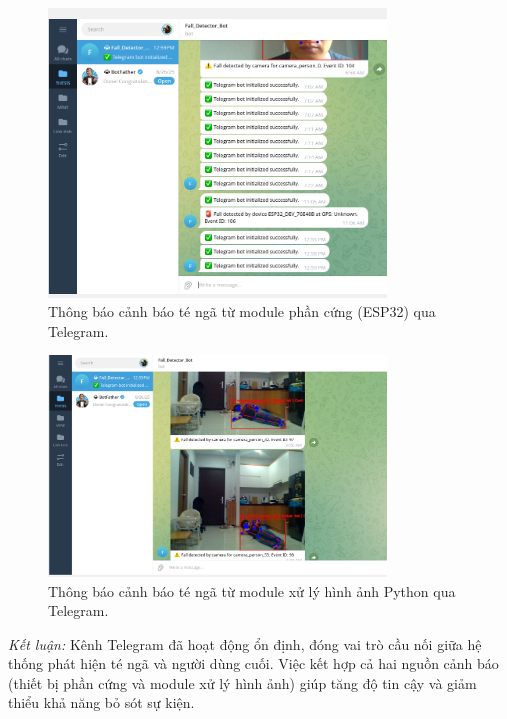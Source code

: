 \begin{figure}[H]
    \centering
    \includegraphics[width=0.8\textwidth]{figures/telegram_fall_module1_send.png}
    \caption{Thông báo cảnh báo té ngã từ module phần cứng (ESP32) qua Telegram.}
    \label{fig:telegram_hw}
\end{figure}

\begin{figure}[H]
    \centering
    \includegraphics[width=0.8\textwidth]{figures/telegram_python_fall_send.png}
    \caption{Thông báo cảnh báo té ngã từ module xử lý hình ảnh Python qua Telegram.}
    \label{fig:telegram_python}
\end{figure}

\textit{Kết luận:} Kênh Telegram đã hoạt động ổn định, đóng vai trò cầu nối giữa hệ thống phát hiện té ngã và người dùng cuối. Việc kết hợp cả hai nguồn cảnh báo (thiết bị phần cứng và module xử lý hình ảnh) giúp tăng độ tin cậy và giảm thiểu khả năng bỏ sót sự kiện.
